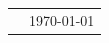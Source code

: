 \documentclass[12pt]{article}
\begin{document}
\baselineskip=14.4pt

\begin{tabular}{ll}
\hspace{3.5in} & \today
\end{tabular}












\end{document}
